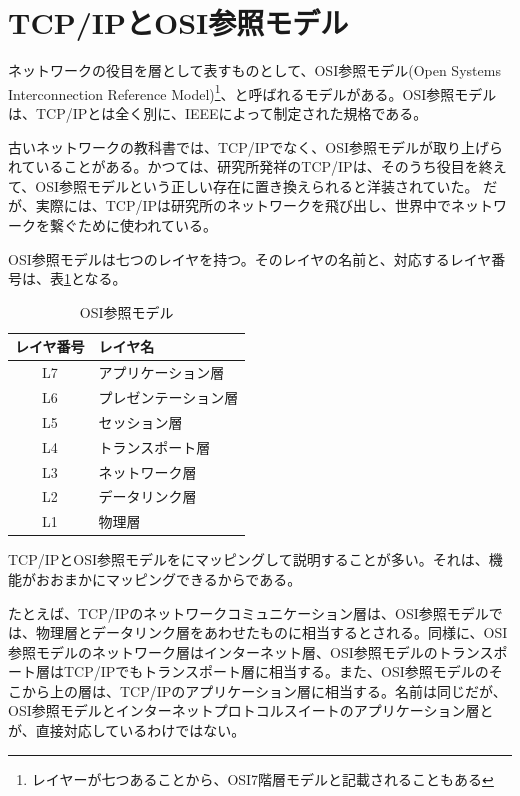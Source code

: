 \section{TCP/IPとOSI参照モデル}
ネットワークの役目を層として表すものとして、OSI参照モデル(Open Systems Interconnection Reference Model)\footnote{レイヤーが七つあることから、OSI7階層モデルと記載されることもある}、と呼ばれるモデルがある。OSI参照モデルは、TCP/IPとは全く別に、IEEEによって制定された規格である。

古いネットワークの教科書では、TCP/IPでなく、OSI参照モデルが取り上げられていることがある。かつては、研究所発祥のTCP/IPは、そのうち役目を終えて、OSI参照モデルという正しい存在に置き換えられると洋装されていた。
だが、実際には、TCP/IPは研究所のネットワークを飛び出し、世界中でネットワークを繋ぐために使われている。

OSI参照モデルは七つのレイヤを持つ。そのレイヤの名前と、対応するレイヤ番号は、表\ref{osirm}となる。

\begin{table}[hbtp] 
\begin{center} \label{osirm}
	\begin{tabular}{cl} \toprule 
		レイヤ番号 & レイヤ名 \\ \midrule
		L7 & アプリケーション層 \\
		L6 & プレゼンテーション層 \\
		L5 & セッション層 \\
		L4 & トランスポート層 \\
		L3 & ネットワーク層 \\
		L2 & データリンク層 \\
		L1 & 物理層 \\ \bottomrule
	\end{tabular}
\end{center} \caption{OSI参照モデル}
\end{table} 

TCP/IPとOSI参照モデルをにマッピングして説明することが多い。それは、機能がおおまかにマッピングできるからである。

たとえば、TCP/IPのネットワークコミュニケーション層は、OSI参照モデルでは、物理層とデータリンク層をあわせたものに相当するとされる。同様に、OSI参照モデルのネットワーク層はインターネット層、OSI参照モデルのトランスポート層はTCP/IPでもトランスポート層に相当する。また、OSI参照モデルのそこから上の層は、TCP/IPのアプリケーション層に相当する。名前は同じだが、OSI参照モデルとインターネットプロトコルスイートのアプリケーション層とが、直接対応しているわけではない。

